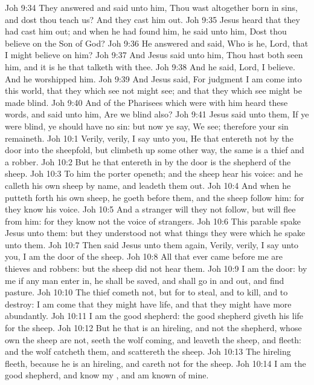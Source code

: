 \vs Joh 9:34 They answered and said unto him, Thou wast altogether born in sins, and dost thou teach us? And they cast him out.
\vs Joh 9:35 Jesus heard that they had cast him out; and when he had found him, he said unto him, Dost thou believe on the Son of God?
\vs Joh 9:36 He answered and said, Who is he, Lord, that I might believe on him?
\vs Joh 9:37 And Jesus said unto him, Thou hast both seen him, and it is he that talketh with thee.
\vs Joh 9:38 And he said, Lord, I believe. And he worshipped him.
\vs Joh 9:39 And Jesus said, For judgment I am come into this world, that they which see not might see; and that they which see might be made blind.
\vs Joh 9:40 And  of the Pharisees which were with him heard these words, and said unto him, Are we blind also?
\vs Joh 9:41 Jesus said unto them, If ye were blind, ye should have no sin: but now ye say, We see; therefore your sin remaineth.
\vs Joh 10:1 Verily, verily, I say unto you, He that entereth not by the door into the sheepfold, but climbeth up some other way, the same is a thief and a robber.
\vs Joh 10:2 But he that entereth in by the door is the shepherd of the sheep.
\vs Joh 10:3 To him the porter openeth; and the sheep hear his voice: and he calleth his own sheep by name, and leadeth them out.
\vs Joh 10:4 And when he putteth forth his own sheep, he goeth before them, and the sheep follow him: for they know his voice.
\vs Joh 10:5 And a stranger will they not follow, but will flee from him: for they know not the voice of strangers.
\vs Joh 10:6 This parable spake Jesus unto them: but they understood not what things they were which he spake unto them.
\vs Joh 10:7 Then said Jesus unto them again, Verily, verily, I say unto you, I am the door of the sheep.
\vs Joh 10:8 All that ever came before me are thieves and robbers: but the sheep did not hear them.
\vs Joh 10:9 I am the door: by me if any man enter in, he shall be saved, and shall go in and out, and find pasture.
\vs Joh 10:10 The thief cometh not, but for to steal, and to kill, and to destroy: I am come that they might have life, and that they might have  more abundantly.
\vs Joh 10:11 I am the good shepherd: the good shepherd giveth his life for the sheep.
\vs Joh 10:12 But he that is an hireling, and not the shepherd, whose own the sheep are not, seeth the wolf coming, and leaveth the sheep, and fleeth: and the wolf catcheth them, and scattereth the sheep.
\vs Joh 10:13 The hireling fleeth, because he is an hireling, and careth not for the sheep.
\vs Joh 10:14 I am the good shepherd, and know my , and am known of mine.
